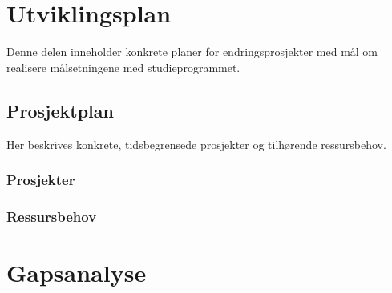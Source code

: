 \documentclass{memoir}
\begin{document}
\appendix

\part{Utviklingsplan}

Denne delen inneholder konkrete planer for endringsprosjekter med mål om realisere målsetningene med studieprogrammet.

\chapter{Prosjektplan}

Her beskrives konkrete, tidsbegrensede prosjekter og tilhørende ressursbehov.

\section{Prosjekter}
\section{Ressursbehov}

\part{Gapsanalyse}


\end{document}
